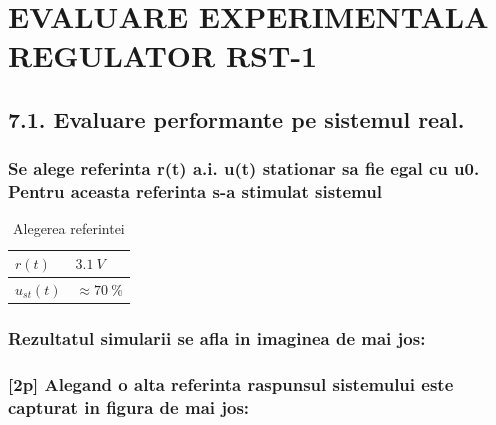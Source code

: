 \documentclass[12pt,english]{article}
\begin{document}
\section {EVALUARE EXPERIMENTALA REGULATOR RST-1 }
\subsection {7.1. Evaluare performante pe sistemul real. }
\subsubsection {Se alege referinta r(t) a.i. u(t) stationar sa fie egal cu u0. Pentru aceasta referinta s-a stimulat sistemul}
\begin{table}[H]
  \centering
    \begin{tabular}{|l|l|}
      \hline
       $r(t)$ & $3.1\ V$ \\
      \hline
       $u_{st}(t)$ & $\approx70\ \%$ \\
      \hline
    \end{tabular}
    \caption{Alegerea referintei}
\end{table}

\subsubsection {Rezultatul simularii se afla in imaginea de mai jos: }
\begin{center}
\end{center}

\subsubsection {[2p] Alegand o alta referinta raspunsul sistemului este capturat in figura de mai jos: }
\begin{center}
\end{center}
\end{document}
